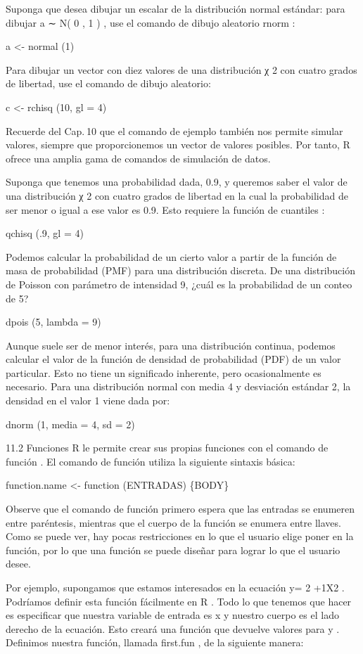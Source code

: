 \documentclass[
]{book}
\begin{document}
Suponga que desea dibujar un escalar de la distribución normal estándar: para dibujar a ∼ N( 0 , 1 ) , use el comando de dibujo aleatorio rnorm :

a \textless- normal (1)

Para dibujar un vector con diez valores de una distribución χ 2 con cuatro grados de libertad, use el comando de dibujo aleatorio:

c \textless- rchisq (10, gl = 4)

Recuerde del Cap. 10 que el comando de ejemplo también nos permite simular valores, siempre que proporcionemos un vector de valores posibles. Por tanto, R ofrece una amplia gama de comandos de simulación de datos.

Suponga que tenemos una probabilidad dada, 0.9, y queremos saber el valor de una distribución χ 2 con cuatro grados de libertad en la cual la probabilidad de ser menor o igual a ese valor es 0.9. Esto requiere la función de cuantiles :

qchisq (.9, gl = 4)

Podemos calcular la probabilidad de un cierto valor a partir de la función de masa de probabilidad (PMF) para una distribución discreta. De una distribución de Poisson con parámetro de intensidad 9, ¿cuál es la probabilidad de un conteo de 5?

dpois (5, lambda = 9)

Aunque suele ser de menor interés, para una distribución continua, podemos calcular el valor de la función de densidad de probabilidad (PDF) de un valor particular. Esto no tiene un significado inherente, pero ocasionalmente es necesario. Para una distribución normal con media 4 y desviación estándar 2, la densidad en el valor 1 viene dada por:

dnorm (1, media = 4, sd = 2)

11.2 Funciones
R le permite crear sus propias funciones con el comando de función . El comando de función utiliza la siguiente sintaxis básica:

function.name \textless- function (ENTRADAS) \{BODY\}

Observe que el comando de función primero espera que las entradas se enumeren entre paréntesis, mientras que el cuerpo de la función se enumera entre llaves. Como se puede ver, hay pocas restricciones en lo que el usuario elige poner en la función, por lo que una función se puede diseñar para lograr lo que el usuario desee.

Por ejemplo, supongamos que estamos interesados \hspace{0pt}\hspace{0pt}en la ecuación y= 2 +1X2 . Podríamos definir esta función fácilmente en R . Todo lo que tenemos que hacer es especificar que nuestra variable de entrada es x y nuestro cuerpo es el lado derecho de la ecuación. Esto creará una función que devuelve valores para y . Definimos nuestra función, llamada first.fun , de la siguiente manera:
\end{document}
